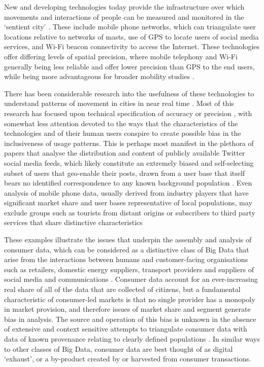 New and developing technologies today provide the infrastructure over which movements and interactions of people can be measured and monitored in the `sentient city' \citep{amin2017seeing}.
These include mobile phone networks, which can triangulate user locations relative to networks of masts, use of GPS to locate users of social media services, and Wi-Fi beacon connectivity to access the Internet.
These technologies offer differing levels of spatial precision, where mobile telephony and Wi-Fi generally being less reliable and offer lower precision than GPS to the end users, while being more advantageous for broader mobility studies \citep{pinelli2015comparing}.

There has been considerable research into the usefulness of these technologies to understand patterns of movement in cities in near real time \citep{candia2008uncovering, gonzalez2008understanding, calabrese2013understanding}. Most of this research has focused upon technical specification of accuracy or precision \citep{song2010limits, lane2010survey}, with somewhat less attention devoted to the ways that the characteristics of the technologies and of their human users conspire to create possible bias in the inclusiveness of usage patterns.
This is perhaps most manifest in the plethora of papers that analyse the distribution and content of publicly available Twitter social media feeds, which likely constitute an extremely biased and self-selecting subset of users that geo-enable their posts, drawn from a user base that itself bears no identified correspondence to any known background population \citep{lansley2016deriving}. 
Even analysis of mobile phone data, usually derived from industry players that have significant market share and user bases representative of local populations, may exclude groups such as tourists from distant origins or subscribers to third party services that share distinctive characteristics \citep{di2016mind}

These examples illustrate the issues that underpin the assembly and analysis of consumer data, which can be considered as a distinctive class of Big Data that arise from the interactions between humans and customer-facing organisations such as retailers, domestic energy suppliers, transport providers and suppliers of social media and communications \citep{cdrc2018consumer}.
Consumer data account for an ever-increasing real share of all of the data that are collected of citizens, but a fundamental characteristic of consumer-led markets is that no single provider has a monopoly in market provision, and therefore issues of market share and segment generate bias in analysis.
The source and operation of this bias is unknown in the absence of extensive and context sensitive attempts to triangulate consumer data with data of known provenance relating to clearly defined populations \citep{lansley2016deriving}.
In similar ways to other classes of Big Data, consumer data are best thought of as digital ‘exhaust’, or a by-product created by or harvested from consumer transactions.

